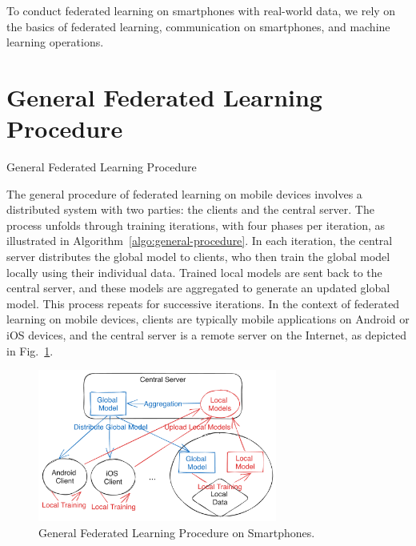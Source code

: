 To conduct federated learning on smartphones with real-world data,
we rely on the basics of federated learning, communication on smartphones,
and machine learning operations.

\section{General Federated Learning Procedure}

\begin{algorithm}
    \caption{General Federated Learning Procedure}
    \label{algo:general-procedure}
\end{algorithm}

The general procedure of federated learning on mobile devices involves a
distributed system with two parties: the clients and the central server.
The process unfolds through training iterations, with four phases per iteration,
as illustrated in Algorithm~\ref{algo:general-procedure}. In each iteration,
the central server distributes the global model to clients,
who then train the global model locally using their individual data.
Trained local models are sent back to the central server,
and these models are aggregated to generate an updated global model.
This process repeats for successive iterations.
In the context of federated learning on mobile devices,
clients are typically mobile applications on Android or iOS devices,
and the central server is a remote server on the Internet,
as depicted in Fig.~\ref{fig:general-fl}.

\begin{figure}\begin{center}
        \includegraphics[width=0.7\textwidth]{general_fl.png}
        \caption{General Federated Learning Procedure on Smartphones.}
        \label{fig:general-fl}
    \end{center}\end{figure}

